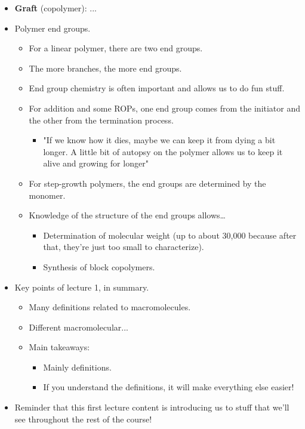 \documentclass[../notes.tex]{subfiles}
\begin{document}
\begin{itemize}
    \item \textbf{Graft} (copolymer): ...
    \item Polymer end groups.
    \begin{itemize}
        \item For a linear polymer, there are two end groups.
        \item The more branches, the more end groups.
        \item End group chemistry is often important and allows us to do fun stuff.
        \item For addition and some ROPs, one end group comes from the initiator and the other from the termination process.
        \begin{itemize}
            \item "If we know how it dies, maybe we can keep it from dying a bit longer. A little bit of autopsy on the polymer allows us to keep it alive and growing for longer"
        \end{itemize}
        \item For step-growth polymers, the end groups are determined by the monomer.
        \item Knowledge of the structure of the end groups allows\dots
        \begin{itemize}
            \item Determination of molecular weight (up to about 30,000 because after that, they're just too small to characterize).
            \item Synthesis of block copolymers.
        \end{itemize}
    \end{itemize}
    \item Key points of lecture 1, in summary.
    \begin{itemize}
        \item Many definitions related to macromolecules.
        \item Different macromolecular...
        \item Main takeaways:
        \begin{itemize}
            \item Mainly definitions.
            \item If you understand the definitions, it will make everything else easier!
        \end{itemize}
    \end{itemize}
    \item Reminder that this first lecture content is introducing us to stuff that we'll see throughout the rest of the course!

\end{itemize}
\end{document}
